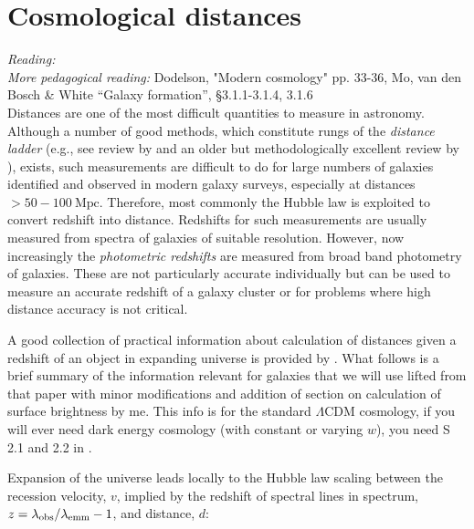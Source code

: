 %
%
%


\chapter{Cosmological distances}
\label{sec:cosmodistances}

\noindent
{\it Reading:} \citet{hogg99}\\[2mm]
{\it More pedagogical reading:} Dodelson, "Modern cosmology" pp. 33-36, Mo, van den Bosch \& White ``Galaxy formation'', \S 3.1.1-3.1.4, 3.1.6\\[2mm]


Distances are one of the most difficult quantities to measure in astronomy. Although a number of good methods, which constitute rungs of the {\it distance ladder} (e.g., see review by \citealt{freedman_madore10}  and an older but methodologically excellent review by \citealt{jacoby_etal92}), exists, such measurements are difficult to do for large numbers of galaxies identified and observed in modern galaxy surveys, especially at distances $>50-100\ \mathrm{Mpc}$. Therefore, most commonly the Hubble law \citep{hubble29} is exploited to convert redshift into distance. Redshifts for such measurements are usually measured from spectra of galaxies of suitable resolution. However, now increasingly the {\it photometric redshifts\/} are measured from broad band photometry of galaxies. These are not particularly accurate individually but can be used to measure an accurate redshift of a galaxy cluster or for problems where high distance accuracy is not critical. 

A good collection of practical information about calculation of distances given a redshift of an object in expanding universe is provided by \citet[][see also Dodelson, "Modern cosmology" pp. 33-36]{hogg99}. What follows is a brief summary of the information relevant for galaxies that we will use lifted from that paper with minor modifications and addition of section on calculation of surface brightness by me. This info is for the standard $\Lambda$CDM cosmology, if you will ever need dark energy cosmology (with constant or varying $w$), you need S 2.1 and 2.2 in \citet{frieman_etal08}. 

Expansion of the universe leads locally to the Hubble law scaling between the recession velocity, $v$, implied by the redshift of spectral lines in spectrum, $z=\lambda_{\rm obs}/\lambda_{\rm emm}-1$, and distance, $d$: 

